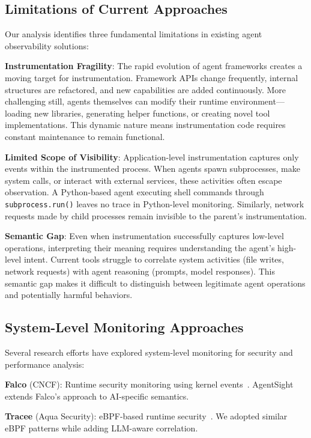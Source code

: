 \documentclass[sigplan,screen，review,9pt]{acmart}
\begin{document}
\subsection{Limitations of Current Approaches}

Our analysis identifies three fundamental limitations in existing agent observability solutions:

\textbf{Instrumentation Fragility}: The rapid evolution of agent frameworks creates a moving target for instrumentation. Framework APIs change frequently, internal structures are refactored, and new capabilities are added continuously. More challenging still, agents themselves can modify their runtime environment—loading new libraries, generating helper functions, or creating novel tool implementations. This dynamic nature means instrumentation code requires constant maintenance to remain functional.

\textbf{Limited Scope of Visibility}: Application-level instrumentation captures only events within the instrumented process. When agents spawn subprocesses, make system calls, or interact with external services, these activities often escape observation. A Python-based agent executing shell commands through \texttt{subprocess.run()} leaves no trace in Python-level monitoring. Similarly, network requests made by child processes remain invisible to the parent's instrumentation.

\textbf{Semantic Gap}: Even when instrumentation successfully captures low-level operations, interpreting their meaning requires understanding the agent's high-level intent. Current tools struggle to correlate system activities (file writes, network requests) with agent reasoning (prompts, model responses). This semantic gap makes it difficult to distinguish between legitimate agent operations and potentially harmful behaviors.

\subsection{System-Level Monitoring Approaches}

Several research efforts have explored system-level monitoring for security and performance analysis:

\textbf{Falco} (CNCF): Runtime security monitoring using kernel events~\cite{falco}. AgentSight extends Falco's approach to AI-specific semantics.

\textbf{Tracee} (Aqua Security): eBPF-based runtime security~\cite{tracee}. We adopted similar eBPF patterns while adding LLM-aware correlation.
\end{document}
